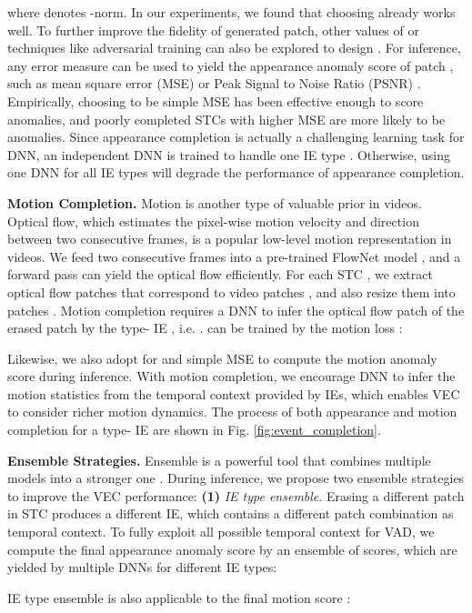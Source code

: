 \documentclass[sigconf]{acmart}
\begin{document}
where  denotes -norm. In our experiments, we found that choosing  already works well. To further improve the fidelity of generated patch, other values of  or techniques like adversarial training can also be explored to design . For inference, any error measure  can be used to yield the appearance anomaly score of patch , such as mean square error (MSE) or Peak Signal to Noise Ratio (PSNR) \cite{liu2018future}. Empirically, choosing  to be simple MSE has been effective enough to score anomalies, and poorly completed STCs with higher MSE are more likely to be anomalies. Since appearance completion is actually a challenging learning task for DNN, an independent DNN  is trained to handle one IE type . Otherwise, using one DNN for all IE types will degrade the performance of appearance completion.

\textbf{Motion Completion.}
Motion is another type of valuable prior in videos. Optical flow, which estimates the pixel-wise motion velocity and direction between two consecutive frames, is a popular low-level motion representation in videos. We feed two consecutive frames into a pre-trained FlowNet model \cite{ilg2017flownet}, and a forward pass can yield the optical flow efficiently. For each STC , we extract optical flow patches  that correspond to video patches , and also resize them into  patches . Motion completion requires a DNN  to infer the optical flow patch  of the erased patch  by the type- IE , i.e. .  can be trained by the motion loss :


Likewise, we also adopt  for  and simple MSE to compute the motion anomaly score  during inference. With motion completion, we encourage DNN to infer the motion statistics from the temporal context provided by IEs, which enables VEC to consider richer motion dynamics. The process of both appearance and motion completion for a type- IE are shown in Fig. \ref{fig:event_completion}.

\textbf{Ensemble Strategies.}
Ensemble is a powerful tool that combines multiple models into a stronger one \cite{dietterich2000ensemble}. During inference, we propose two ensemble strategies to improve the VEC performance: \textbf{(1)} \textit{IE type ensemble}. Erasing a different patch in STC produces a different IE, which contains a different patch combination as temporal context. To fully exploit all possible temporal context for VAD, we compute the final appearance anomaly score by an ensemble of scores, which are yielded by multiple DNNs for different IE types:


IE type ensemble is also applicable to the final motion score :
\end{document}
